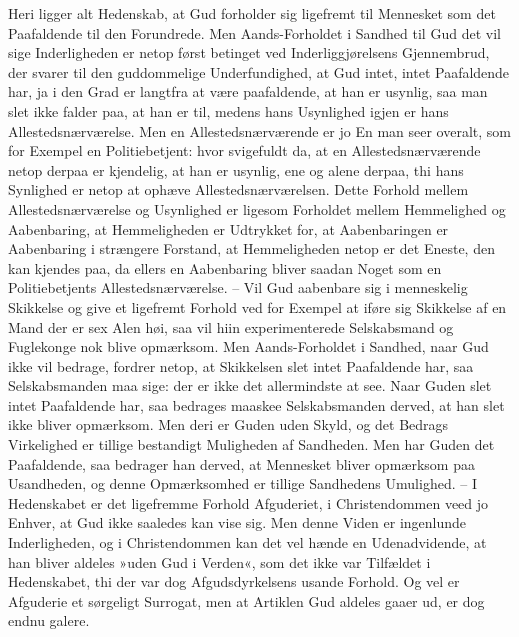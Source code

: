 \documentclass[12pt,a4paper]{article}
\begin{document}
Heri ligger alt Hedenskab, at Gud forholder sig ligefremt til Mennesket som det Paafaldende til den Forundrede. Men Aands-Forholdet i Sandhed til Gud det vil sige Inderligheden er netop først betinget ved Inderliggjørelsens Gjennembrud, der svarer til den guddommelige Underfundighed, at Gud intet, intet Paafaldende har, ja i den Grad er langtfra at være paafaldende, at han er usynlig, saa man slet ikke falder paa, at han er til, medens hans Usynlighed igjen er hans Allestedsnærværelse. Men en Allestedsnærværende er jo En man seer overalt, som for Exempel en Politiebetjent: hvor svigefuldt da, at en Allestedsnærværende netop derpaa er kjendelig, at han er usynlig, ene og alene derpaa, thi hans Synlighed er netop at ophæve Allestedsnærværelsen. Dette Forhold mellem Allestedsnærværelse og Usynlighed er ligesom Forholdet mellem Hemmelighed og Aabenbaring, at Hemmeligheden er Udtrykket for, at Aabenbaringen er Aabenbaring i strængere Forstand, at Hemmeligheden netop er det Eneste, den kan kjendes paa, da ellers en Aabenbaring bliver saadan Noget som en Politiebetjents Allestedsnærværelse. – Vil Gud aabenbare sig i menneskelig Skikkelse og give et ligefremt Forhold ved for Exempel at iføre sig Skikkelse af en Mand der er sex Alen høi, saa vil hiin experimenterede Selskabsmand og Fuglekonge nok blive opmærksom. Men Aands-Forholdet i Sandhed, naar Gud ikke vil bedrage, fordrer netop, at Skikkelsen slet intet Paafaldende har, saa Selskabsmanden maa sige: der er ikke det allermindste at see. Naar Guden slet intet Paafaldende har, saa bedrages maaskee Selskabsmanden derved, at han slet ikke bliver opmærksom. Men deri er Guden uden Skyld, og det Bedrags Virkelighed er tillige bestandigt Muligheden af Sandheden. Men har Guden det Paafaldende, saa bedrager han derved, at Mennesket bliver opmærksom paa Usandheden, og denne Opmærksomhed er tillige Sandhedens Umulighed. – I Hedenskabet er det ligefremme Forhold Afguderiet, i Christendommen veed jo Enhver, at Gud ikke saaledes kan vise sig. Men denne Viden er ingenlunde Inderligheden, og i Christendommen kan det vel hænde en Udenadvidende, at han bliver aldeles »uden Gud i Verden«, som det ikke var Tilfældet i Hedenskabet, thi der var dog Afgudsdyrkelsens usande Forhold. Og vel er Afguderie et sørgeligt Surrogat, men at Artiklen Gud aldeles gaaer ud, er dog endnu galere.
\end{document}
